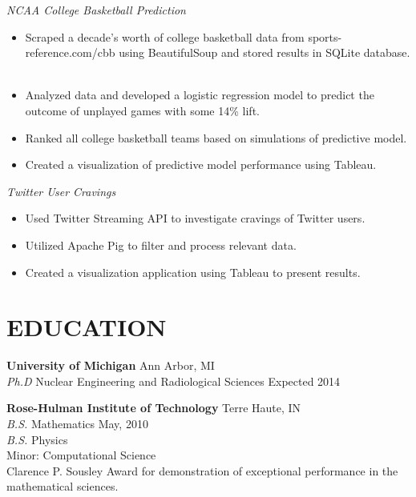 \documentclass[margin, 10pt]{res} %
\begin{document}
\begin{resume}
{\sl NCAA College Basketball Prediction} 

\begin{itemize} \itemsep -2pt %
\item Scraped a decade's worth of college basketball data from sports-reference.com/cbb using BeautifulSoup and stored results in SQLite database.  
\item Analyzed data and developed a logistic regression model to predict the outcome of unplayed games with some 14\% lift. 
\item Ranked all college basketball teams based on simulations of predictive model. 
\item Created a visualization of predictive model performance using Tableau.
\end{itemize}

{\sl Twitter User Cravings}

\begin{itemize} \itemsep -2pt %
\item Used Twitter Streaming API to investigate cravings of Twitter users. 
\item Utilized Apache Pig to filter and process relevant data. 
\item Created a visualization application using Tableau to present results. 
\end{itemize}


\section{EDUCATION}

\textbf{University of Michigan} \hfill Ann Arbor, MI \\
{\sl Ph.D} Nuclear Engineering and Radiological Sciences \hfill Expected 2014

\textbf{Rose-Hulman Institute of Technology} \hfill Terre Haute, IN \\
{\sl B.S.} Mathematics \hfill May, 2010 \\
{\sl B.S.} Physics \\
Minor: Computational Science \\
Clarence P. Sousley Award for demonstration of exceptional performance in the mathematical sciences.
  
\end{resume}
\end{document}
